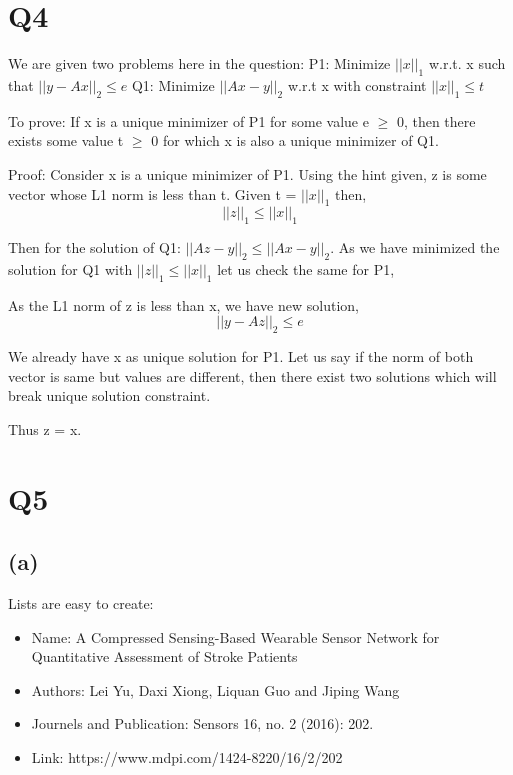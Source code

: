 \documentclass{article}
\begin{document}
\section{Q4}
We are given two problems here in the question:
\newline
P1: Minimize $||x||_1$ w.r.t. x such that $||y − Ax||_2  \le e$
\newline
Q1: Minimize $||Ax - y||_2 $ w.r.t  x with constraint $||x||_1 \le t$

To prove:
If x is a unique minimizer of P1 for some value e $\ge$ 0, then there exists some value t $\ge$ 0 for which x is also a unique minimizer of Q1.

Proof:
Consider x is a unique minimizer of P1.
Using the hint given,
z is some vector whose L1 norm is less than t. Given t = $||x||_1$
then, $$||z||_1 \le  ||x||_1$$

Then for the solution of Q1:
$||Az - y||_2 \le ||Ax-y||_2$.
As we have minimized the solution for Q1 with $||z||_1 \le ||x||_1$ 
let us check the same for P1,

As the L1 norm of z is less than x, we have new solution,
$$||y - Az||_2 \le e$$

We already have x as unique solution for P1.
Let us say if the norm of both vector is same but values are different, then there exist two solutions which will break unique solution constraint.

Thus z = x.
\section{Q5}
\subsection{(a)}
Lists are easy to create:
\begin{itemize}
  \item Name: A Compressed Sensing-Based Wearable Sensor
Network for Quantitative Assessment of
Stroke Patients
  \item Authors: Lei Yu, Daxi Xiong, Liquan Guo and Jiping Wang
  \item Journels and Publication: Sensors 16, no. 2 (2016): 202.
  \item Link: https://www.mdpi.com/1424-8220/16/2/202
\end{itemize}
\end{document}
